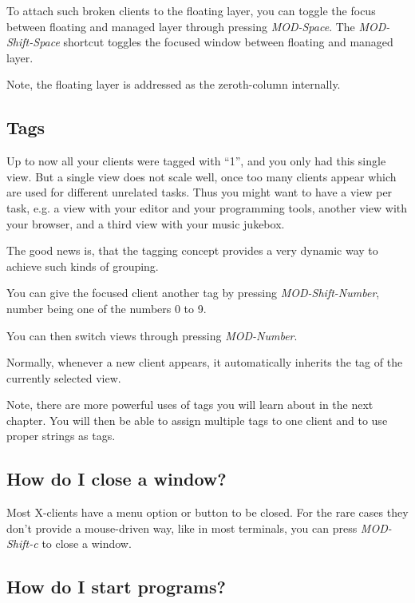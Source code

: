 \documentclass[12pt,a4paper]{article} %
\newcommand{\wmii}{\emph{wmii}}
\begin{document}
    To attach such broken clients to the floating layer, you can toggle the
    focus between floating and managed layer through pressing \emph{MOD-Space}.
    The \emph{MOD-Shift-Space} shortcut toggles the focused window between
    floating and managed layer.

    Note, the floating layer is addressed as the zeroth-column internally.

    \subsection{Tags}

    Up to now all your clients were tagged with ``1'', and you only had
    this single view. But a single view does not scale well, once
    too many clients appear which are used for different unrelated tasks.
    Thus you might want to have a view per task, e.g. a view
    with your editor and your programming tools, another view 
    with your browser, and a third view with your music jukebox.

    The good news is, that the tagging concept provides a very dynamic way to
    achieve such kinds of grouping.

    You can give the focused client another tag by pressing
    \emph{MOD-Shift-Number}, number being one of the numbers 0 to 9.

    You can then switch views through pressing \emph{MOD-Number}.

    Normally, whenever a new client appears, it automatically inherits the tag
    of the currently selected view.


    Note, there are more powerful uses of tags you will learn about in the next
    chapter. You will then be able to assign multiple tags to one client and to
    use proper strings as tags.

    \subsection{How do I close a window?}

    Most X-clients have a menu option or button to be closed. For the rare
    cases they don't provide a mouse-driven way, like in most terminals,
    you can press \emph{MOD-Shift-c} to close a window.

    \subsection{How do I start programs?}
\end{document}
